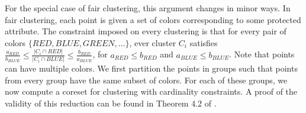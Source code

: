For the special case of fair clustering, this argument changes in minor ways. In fair clustering, each point is given a set of colors corresponding to some protected attribute. The constraint imposed on every clustering is that for every pair of colors $\{RED, BLUE, GREEN,\ldots \}$, ever cluster $C_i$ satisfies $\frac{a_{RED}}{b_{BLUE}} \leq \frac{|C_i\cap RED|}{|C_i\cap BLUE|} \leq \frac{b_{RED}}{a_{BLUE}}$, for $a_{RED}\leq b_{RED}$ and $a_{BLUE}\leq b_{BLUE}$. Note that points can have multiple colors.
We first partition the points in groups such that points from every group have the same subset of colors. For each of these groups, we now compute a coreset for clustering with cardinality constraints. A proof of the validity of this reduction can be found in Theorem 4.2 of \cite{HuangJV19}.





